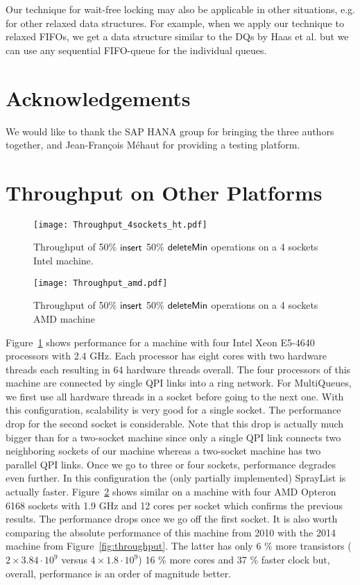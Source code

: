\documentclass[a4paper,12pt]{article}
\newcommand{\Id}[1]{\ensuremath{\text{{\sf #1}}}}
\begin{document}
Our technique for wait-free locking may also be applicable in other situations, e.g. for other relaxed data structures. For example, when we apply our technique to relaxed FIFOs, we get a data structure similar to the DQs by Haas et al. \cite{HLHPSKS13} but we can use any sequential FIFO-queue for the individual queues.

\section*{Acknowledgements}
We would like to thank the SAP HANA group for bringing the three authors together,
and Jean-Fran\c{c}ois M\'ehaut for providing a testing platform.




\clearpage
\appendix
\section{Throughput on Other Platforms}
\begin{figure}[h]
\centering\texttt{[image: Throughput\_4sockets\_ht.pdf]}
\caption{Throughput of 50\% \Id{insert} 50\% \Id{deleteMin} operations on a 4 sockets Intel machine.} 
\label{fig:socket4ht}
\end{figure}
\begin{figure}[h]
\centering\texttt{[image: Throughput\_amd.pdf]}
\caption{Throughput of 50\% \Id{insert} 50\% \Id{deleteMin} operations on a 4 sockets AMD machine} 
\label{fig:4socketAMD}
\end{figure}

Figure~\ref{fig:socket4ht} shows performance for a machine with 
four Intel Xeon E5-4640 processors with 2.4 GHz. Each processor has eight cores with two hardware threads each resulting in 64 hardware threads overall.
The four processors of this machine are connected by single QPI links into a ring network.
For MultiQueues, we first use all hardware threads in a socket before going to the next one. With this configuration, scalability is very good for a single socket. The performance drop for the second socket is considerable. Note that this drop is actually much bigger than for a two-socket machine since only a single QPI link connects two neighboring sockets of our machine whereas a two-socket machine has two parallel QPI links. Once we go to three or four sockets, performance degrades even further. In this configuration the (only partially implemented) SprayList is actually faster.
Figure~\ref{fig:4socketAMD} shows similar on a machine with four AMD Opteron 6168 sockets with 1.9 GHz and 12 cores per socket which confirms the previous results. The performance drops once we go off the first socket.
It is also worth comparing the absolute performance of this machine from 
2010 with the 2014 machine from Figure~\ref{fig:throughput}. The latter has only
6 \% more transistors ($2\times 3.84\cdot 10^9$ versus $4\times 1.8\cdot 10^9$) 16 \% more cores and 37 \% faster clock but, overall, performance is an order of magnitude better. 
\end{document}
